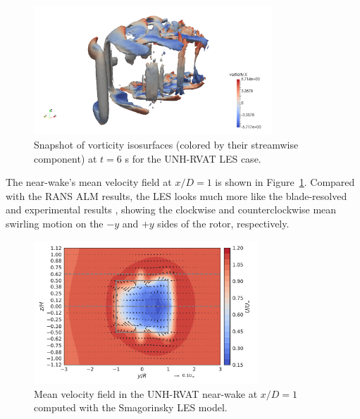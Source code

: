 \documentclass[times]{weauth}
\begin{document}
\begin{figure}
    \centering

    \includegraphics[width=0.8\textwidth]{RVAT-ALM-LES_vorticity-snapshot}

    \caption{Snapshot of vorticity isosurfaces (colored by their streamwise
        component) at $t=6$ s for the UNH-RVAT LES case.}

    \label{RVAT-ALM-LES-vorticity}
\end{figure}

The near-wake's mean velocity field at $x/D=1$ is shown in
Figure~\ref{RVAT-ALM-LES-vorticity}. Compared with the RANS ALM results, the LES
looks much more like the blade-resolved and experimental results
\cite{Bachant2015-JoT}, showing the clockwise and counterclockwise mean swirling
motion on the $-y$ and $+y$ sides of the rotor, respectively.

\begin{figure}
    \centering

    \includegraphics[width=0.75\textwidth]{RVAT-ALM-LES_meancontquiv}

    \caption{Mean velocity field in the UNH-RVAT near-wake at $x/D=1$ computed
        with the Smagorinsky LES model.}

    \label{fig:RVAT-ALM-LES-meancontquiv}
\end{figure}
\end{document}
